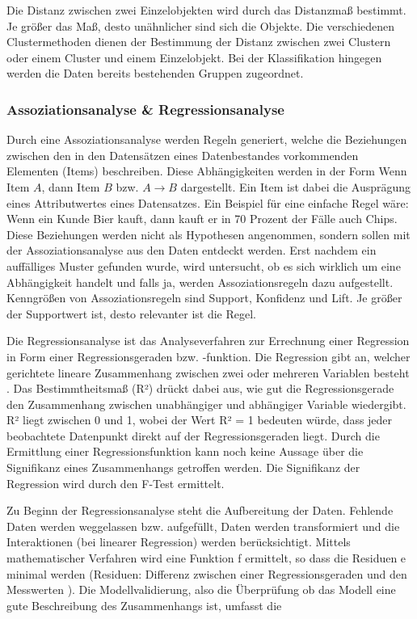 Die Distanz zwischen zwei Einzelobjekten wird durch das Distanzmaß bestimmt. Je größer das Maß, desto unähnlicher sind sich die Objekte. Die verschiedenen Clustermethoden \cite{Janssen.2007} dienen der Bestimmung der Distanz zwischen zwei Clustern oder einem Cluster und einem Einzelobjekt. Bei der Klassifikation hingegen werden die Daten bereits bestehenden Gruppen zugeordnet.
	
\subsubsection{Assoziationsanalyse \& Regressionsanalyse}

\glqq Durch eine Assoziationsanalyse werden Regeln generiert, welche die Beziehungen zwischen den in den Datensätzen eines Datenbestandes vorkommenden Elementen (Items) beschreiben.\grqq \cite{Gluchowski:2006} Diese Abhängigkeiten werden in der Form Wenn Item $A$, dann Item $B$ bzw. $A \rightarrow B$  dargestellt. Ein Item ist dabei die Ausprägung eines Attributwertes eines Datensatzes. Ein Beispiel für eine einfache Regel wäre: Wenn ein Kunde Bier kauft, dann kauft er in 70 Prozent der Fälle auch Chips. Diese Beziehungen werden nicht als Hypothesen angenommen, sondern sollen mit der Assoziationsanalyse aus den Daten entdeckt werden. Erst nachdem ein auffälliges Muster gefunden wurde, wird untersucht, ob es sich wirklich um eine Abhängigkeit handelt und falls ja, werden Assoziationsregeln dazu aufgestellt. Kenngrößen von Assoziationsregeln sind Support, Konfidenz und Lift. \glqq Je größer der Supportwert ist, desto relevanter ist die Regel.\grqq \cite{Gluchowski:2006}
	
Die Regressionsanalyse ist das Analyseverfahren zur Errechnung einer Regression in Form einer Regressionsgeraden bzw. -funktion. Die Regression gibt an, welcher gerichtete lineare Zusammenhang zwischen zwei oder mehreren Variablen besteht \cite{Gluchowski:2006}. Das Bestimmtheitsmaß (R²) drückt dabei aus, wie gut die Regressionsgerade den Zusammenhang zwischen unabhängiger und abhängiger Variable wiedergibt. R² liegt zwischen 0 und 1, wobei der Wert R² = 1 bedeuten würde, dass jeder beobachtete Datenpunkt direkt auf der Regressionsgeraden liegt. Durch die Ermittlung einer Regressionsfunktion kann noch keine Aussage über die Signifikanz eines Zusammenhangs getroffen werden. Die Signifikanz der Regression wird durch den F-Test ermittelt.

Zu Beginn der Regressionsanalyse steht die Aufbereitung der Daten. Fehlende Daten werden weggelassen bzw. aufgefüllt, Daten werden transformiert und die Interaktionen (bei linearer Regression) werden berücksichtigt. Mittels mathematischer Verfahren wird eine Funktion f ermittelt, so dass die Residuen e minimal werden (Residuen: Differenz zwischen einer Regressionsgeraden und den Messwerten \cite{Kaehler:2011}). Die Modellvalidierung, also die Überprüfung ob das Modell eine gute Beschreibung des Zusammenhangs ist, umfasst die
	
